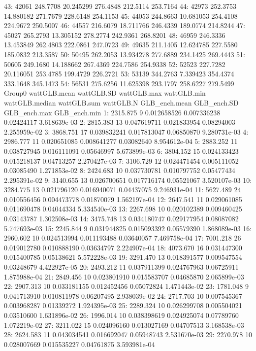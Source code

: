 \documentclass[
  10pt,
  a4paper,oneside]{article}
\begin{document}
43: 42061 248.7708 20.245299 276.4848 212.5114 253.7164
44: 42973 252.3753 14.880182 271.7679 228.6148 254.1153
45: 44053 244.8663 10.681053 254.4108 224.9672 250.5007
46: 44557 216.6079 18.711766 246.4339 189.0774 214.8244
47: 45027 265.2793 13.305152 278.2774 242.9361 268.8201
48: 46959 246.3336 13.453849 262.4803 222.0861 247.0723
49: 49635 211.1405 12.624785 227.5580 185.0832 213.3587
50: 50495 262.2053 13.934278 277.6889 234.1425 269.4443
51: 50605 249.1680 14.188662 267.4369 224.7586 254.9338
52: 52523 227.7282 20.116051 253.4785 199.4729 226.2721
53: 53139 344.2763 7.339423 354.4374 333.1648 345.1473
54: 56531 275.6256 11.625398 293.1797 258.6227 279.5499
Group0 wattGLB.mean wattGLB.SD wattGLB.max wattGLB.min wattGLB.median
wattGLB.sum wattGLB.N GLB\_ench.mean GLB\_ench.SD GLB\_ench.max GLB\_ench.min
1: 2315.875 9 0.012658526 0.007336238 0.02424117 3.618639e-03
2: 2815.383 13 0.047619711 0.021833954 0.08294003 2.255959e-02
3: 3868.751 17 0.039832241 0.017813047 0.06850870 9.280731e-03
4: 2986.777 11 0.020651085 0.008641277 0.03082640 8.954612e-04
5: 2883.252 11 0.038727945 0.016111091 0.05646997 5.673899e-03
6: 3804.152 15 0.024133423 0.015218137 0.04713257 2.270427e-03
7: 3106.729 12 0.024471454 0.005111052 0.03085490 1.271853e-02
8: 2424.683 10 0.037730781 0.010797752 0.05477434 2.295391e-02
9: 3140.655 13 0.026700651 0.017716174 0.05521067 3.520107e-03
10: 3284.775 13 0.021796120 0.016940071 0.04437075 9.246931e-04
11: 5627.489 24 0.010556456 0.004473778 0.01870079 1.562197e-04
12: 2647.541 11 0.029061085 0.011690478 0.04044334 5.334540e-03
13: 2267.698 10 0.020102389 0.009460425 0.03143787 1.302508e-03
14: 3475.748 13 0.034180747 0.029177954 0.08087082 5.747693e-03
15: 2245.844 9 0.031944825 0.015093392 0.05579390 1.868089e-03
16: 2960.602 10 0.024513994 0.011193488 0.03640057 7.469758e-04
17: 7001.218 26 0.019012780 0.010888190 0.03634797 2.224907e-04
18: 4073.670 16 0.031447300 0.015400785 0.05138621 5.572228e-03
19: 3291.470 13 0.018391577 0.009547554 0.03248679 4.422927e-05
20: 2493.212 11 0.037911399 0.024767963 0.06725911 1.875988e-04
21: 2849.456 10 0.023801910 0.015583707 0.04685870 2.065899e-03
22: 2907.313 10 0.033181155 0.012452456 0.05072824 1.471443e-02
23: 1781.048 9 0.041713910 0.010811978 0.06207495 2.938039e-02
24: 2717.703 10 0.007545367 0.003968287 0.01339272 1.924395e-03
25: 2289.324 10 0.026299708 0.005504021 0.03510600 1.631896e-02
26: 1996.014 10 0.038398619 0.024925074 0.07789760 1.072219e-02
27: 3211.022 15 0.024096160 0.013027169 0.04707513 3.168538e-03
28: 2624.583 11 0.043034541 0.016692047 0.05948743 2.531670e-03
29: 2270.978 10 0.028007669 0.015535227 0.04761875 3.593981e-04
\end{document}
